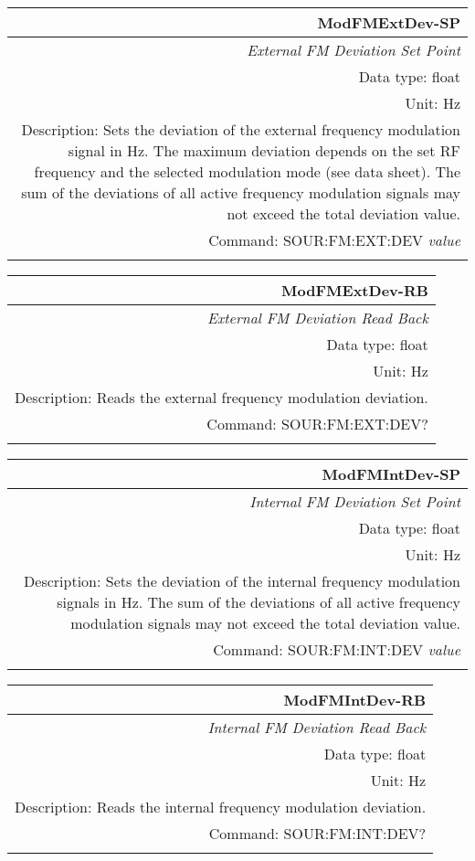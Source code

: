 \documentclass[openany]{article}
\begin{document}
		\begin{tabular}{N}
			\hline
			\bfseries ModFMExtDev-SP \\ \hline
			\emph{External FM Deviation Set Point} \\
			Data type: float \\
			Unit: Hz \\ 
			Description: Sets the deviation of the external frequency modulation signal in Hz. The maximum deviation depends on the set RF frequency and the selected modulation mode (see data sheet). The sum of the deviations of all active frequency modulation signals may not exceed the total deviation value. \\
			Command: SOUR:FM:EXT:DEV \emph{value} \\
			\\
			
		\end{tabular}


		\begin{tabular}{N}
			\hline
			\bfseries ModFMExtDev-RB \\ \hline
			\emph{External FM Deviation Read Back} \\
			Data type: float \\
			Unit: Hz \\
			Description: Reads the external frequency modulation deviation. \\
			Command: SOUR:FM:EXT:DEV? \\
			\\

		\end{tabular}


		\begin{tabular}{N}
			\hline
			\bfseries ModFMIntDev-SP \\ \hline
			\emph{Internal FM Deviation Set Point} \\
			Data type: float \\
			Unit: Hz \\ 
			Description: Sets the deviation of the internal frequency modulation signals in Hz. The sum of the deviations of all active frequency modulation signals may not exceed the total deviation value. \\
			Command: SOUR:FM:INT:DEV \emph{value} \\
			\\
			
		\end{tabular}


		\begin{tabular}{N}
			\hline
			\bfseries ModFMIntDev-RB \\ \hline
			\emph{Internal FM Deviation Read Back} \\
			Data type: float \\
			Unit: Hz \\
			Description: Reads the internal frequency modulation deviation. \\
			Command: SOUR:FM:INT:DEV? \\
			\\

		\end{tabular}
\end{document}
